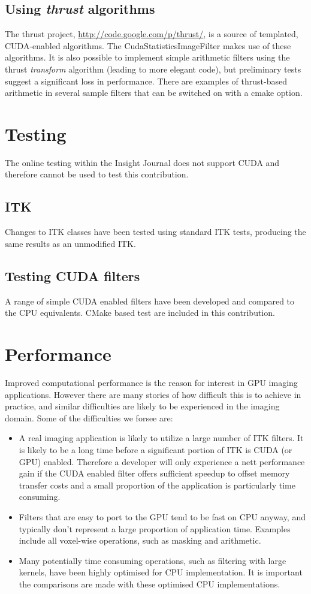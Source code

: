 \documentclass{InsightArticle}
\begin{document}
\subsection{Using {\em thrust} algorithms}
The thrust project, \url{http://code.google.com/p/thrust/}, is a
source of templated, CUDA-enabled algorithms. The
CudaStatisticsImageFilter makes use of these algorithms. It is also
possible to implement simple arithmetic filters using the thrust {\em
  transform} algorithm (leading to more elegant code), but preliminary
tests suggest a significant loss in performance. There are
examples of thrust-based arithmetic in several sample filters that can
be switched on with a cmake option.

\section{Testing}
The online testing within the Insight Journal does not support CUDA
and therefore cannot be used to test this contribution.
\subsection{ITK}
Changes to ITK classes have been tested using standard ITK tests,
producing the same results as an unmodified ITK.
\subsection{Testing CUDA filters}
A range of simple CUDA enabled filters have been developed and
compared to the CPU equivalents. CMake based test are included in this
contribution.

\section{Performance}
Improved computational performance is the reason for interest in GPU
imaging applications. However there are many stories of how difficult
this is to achieve in practice, and similar difficulties are likely to
be experienced in the imaging domain. Some of the difficulties we
forsee are:
\begin{itemize}
\item A real imaging application is likely to utilize a large number
  of ITK filters. It is likely to be a long time before a significant
  portion of ITK is CUDA (or GPU) enabled. Therefore a developer will
  only experience a nett performance gain if the CUDA enabled filter
  offers sufficient speedup to offset memory transfer costs and a
  small proportion of the application is particularly time consuming.
\item Filters that are easy to port to the GPU tend to be fast on CPU
  anyway, and typically don't represent a large proportion of
  application time. Examples include all voxel-wise operations, such
  as masking and arithmetic.
\item Many potentially time consuming operations, such as filtering
  with large kernels, have been highly optimised for CPU
  implementation. It is important the comparisons are made with these
  optimised CPU implementations.
\end{itemize}
\end{document}
